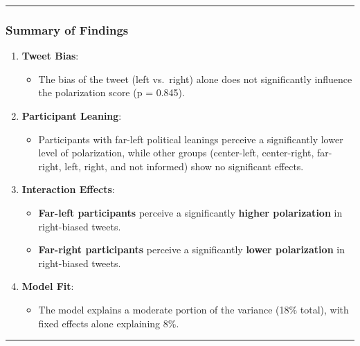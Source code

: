 \documentclass[
]{article}
\providecommand{\tightlist}{%
  \setlength{\itemsep}{0pt}\setlength{\parskip}{0pt}}
\begin{document}
\begin{center}\rule{0.5\linewidth}{0.5pt}\end{center}

\subsubsection{\texorpdfstring{\textbf{Summary of
Findings}}{Summary of Findings}}\label{summary-of-findings-4}

\begin{enumerate}
\def\labelenumi{\arabic{enumi}.}
\tightlist
\item
  \textbf{Tweet Bias}:

  \begin{itemize}
  \tightlist
  \item
    The bias of the tweet (left vs.~right) alone does not significantly
    influence the polarization score (p = 0.845).
  \end{itemize}
\item
  \textbf{Participant Leaning}:

  \begin{itemize}
  \tightlist
  \item
    Participants with far-left political leanings perceive a
    significantly lower level of polarization, while other groups
    (center-left, center-right, far-right, left, right, and not
    informed) show no significant effects.
  \end{itemize}
\item
  \textbf{Interaction Effects}:

  \begin{itemize}
  \tightlist
  \item
    \textbf{Far-left participants} perceive a significantly
    \textbf{higher polarization} in right-biased tweets.
  \item
    \textbf{Far-right participants} perceive a significantly
    \textbf{lower polarization} in right-biased tweets.
  \end{itemize}
\item
  \textbf{Model Fit}:

  \begin{itemize}
  \tightlist
  \item
    The model explains a moderate portion of the variance (18\% total),
    with fixed effects alone explaining 8\%.
  \end{itemize}
\end{enumerate}

\begin{center}\rule{0.5\linewidth}{0.5pt}\end{center}
\end{document}
